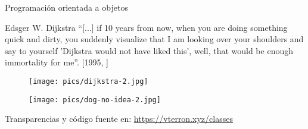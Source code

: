 
\begin{frame}{Programación orientada a objetos}
  \small
  \begin{block}
    {\centering Edsger W. Dijkstra}
    \centering
    ``[...] if 10 years from now, when you are doing something quick
    and dirty, you suddenly visualize that I am looking over your
    shoulders and say to yourself 'Dijkstra would not have liked
    this', well, that would be enough immortality for me''.
    [1995, \href{http://www.cs.utexas.edu/users/EWD/ewd12xx/EWD1213.PDF}{}]
  \end{block}

  \begin{figure}
    \centering
    \texttt{[image: pics/dijkstra-2.jpg]}
  \end{figure}
\end{frame}

\begin{frame}{\inserttitle}
    \begin{figure}
    \centering
    \texttt{[image: pics/dog-no-idea-2.jpg]}
  \end{figure}

  \begin{block}{\centering Transparencias y código fuente en:}
    \centering \url{https://vterron.xyz/classes}
  \end{block}
\end{frame}
